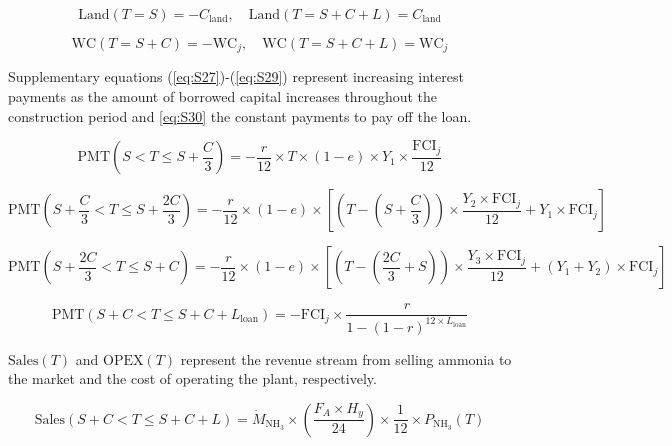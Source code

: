 \documentclass{article}
\begin{document}
\begin{equation}
\text{Land}(T=S) = -C_{\text{land}}, \quad \text{Land}(T=S+C+L) = C_{\text{land}}
\label{eq:S25}
\end{equation}

\begin{equation}
\text{WC}(T=S+C) = -\text{WC}_j, \quad \text{WC}(T=S+C+L) = \text{WC}_j
\label{eq:S26}
\end{equation}

Supplementary equations (\ref{eq:S27})-(\ref{eq:S29}) represent increasing interest payments as the amount of borrowed capital increases throughout the construction period and \ref{eq:S30} the constant payments to pay off the loan.

\begin{equation}
\text{PMT}(S < T \leq S + \frac{C}{3}) = -\frac{r}{12} \times T \times (1-e) \times Y_1 \times \frac{\text{FCI}_j}{12}
\label{eq:S27}
\end{equation}

\begin{equation}
\text{PMT}(S + \frac{C}{3} < T \leq S + \frac{2C}{3}) = -\frac{r}{12} \times (1-e) \times \left[ \left(T - \left(S + \frac{C}{3}\right)\right) \times \frac{Y_2 \times \text{FCI}_j}{12} + Y_1 \times \text{FCI}_j \right]
\label{eq:S28}
\end{equation}

\begin{equation}
\text{PMT}(S + \frac{2C}{3} < T \leq S + C) = -\frac{r}{12} \times (1-e) \times \left[ \left(T - \left(\frac{2C}{3} + S\right)\right) \times \frac{Y_3 \times \text{FCI}_j}{12} + (Y_1 + Y_2) \times \text{FCI}_j \right]
\label{eq:S29}
\end{equation}

\begin{equation}
\text{PMT}(S + C < T \leq S + C + L_{\text{loan}}) = -\text{FCI}_j \times \frac{r}{1 - (1 - r)^{12 \times L_{\text{loan}}}}
\label{eq:S30}
\end{equation}

\( \text{Sales}(T) \) and \( \text{OPEX}(T) \) represent the revenue stream from selling ammonia to the market and the cost of operating the plant, respectively.

\begin{equation}
\text{Sales}(S + C < T \leq S + C + L) = \dot{M}_{\text{NH}_3} \times \left(\frac{F_A \times H_y}{24}\right) \times \frac{1}{12} \times P_{\text{NH}_3}(T)
\label{eq:S31}
\end{equation}
\end{document}
